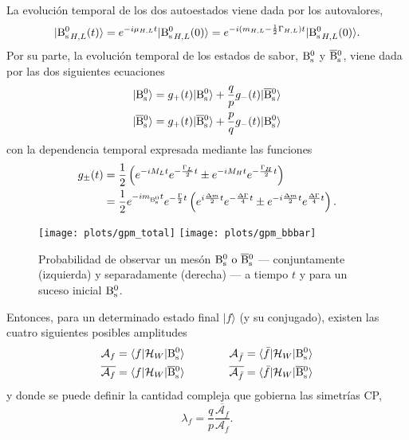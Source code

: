 La evolución temporal de los dos autoestados viene dada por los autovalores,
\[|{\mathrm{B}{}_{\mathrm{s}}^{0}}_{H,L} (t) \rangle  = e^{-i \mu_{H,L}t } |{\mathrm{B}{}_{\mathrm{s}}^{0}}_{H,L} (0)\rangle = e^{-i (m_{H,L} - \frac{1}{2} \Gamma_{H,L})t} |{\mathrm{B}{}_{\mathrm{s}}^{0}}_{H,L} (0)\rangle. \]
Por su parte, la evolución temporal de los estados de sabor, $\mathrm{B}{}_{\mathrm{s}}^{0}$ y $\overline{\mathrm{B}}{}_{\mathrm{s}}^{0}$, viene dada por las dos siguientes ecuaciones
\begin{equation}
\begin{split}
|\mathrm{B}{}_{\mathrm{s}}^{0}\rangle  = g_+(t) |\mathrm{B}{}_{\mathrm{s}}^{0}\rangle  + \frac{q}{p} g_-(t) |\overline{\mathrm{B}}{}_{\mathrm{s}}^{0}\rangle\\
|\overline{\mathrm{B}}{}_{\mathrm{s}}^{0}\rangle = g_+(t) |\overline{\mathrm{B}}{}_{\mathrm{s}}^{0}\rangle + \frac{p}{q} g_-(t) |\mathrm{B}{}_{\mathrm{s}}^{0} \rangle
\end{split}	
\end{equation}
%
con la dependencia temporal expresada mediante las funciones
\begin{equation}
\begin{split}
g_{\pm}(t) &=  \frac{1}{2} \left( e^{-iM_Lt} e^{-\frac{\Gamma_L}{2} t} \pm e^{-iM_Ht} e^{-\frac{\Gamma_H}{2} t} \right) \\
& = \frac{1}{2} e^{-im_{\mathrm{B}{}_{\mathrm{s}}^{0}}t} e^{-\frac{\Gamma}{2}t} \left( e^{i\frac{\Delta m}{2}t} e^{-\frac{\Delta \Gamma}{4}t}  \pm e^{-i\frac{\Delta m}{2}t} e^{\frac{\Delta \Gamma}{4}t} \right).	
\end{split} \label{eq_gedete}
\end{equation}
%
%
%
%
%
\begin{figure}[H]
\centering
\texttt{[image: plots/gpm\_total]}	 \hfill
\texttt{[image: plots/gpm\_bbbar]}	 \hfill
\caption{Probabilidad de observar un mesón $\mathrm{B}{}_{\mathrm{s}}^{0} \text{ o } \overline{\mathrm{B}}{}_{\mathrm{s}}^{0}$ --- conjuntamente  (izquierda) y separadamente (derecha) --- a tiempo $t$ \color{vero} y para un suceso inicial $\mathrm{B}{}_{\mathrm{s}}^{0}$. \color{norm} }
\end{figure}

Entonces, para un determinado estado final $|f\rangle$ (y su conjugado), existen las cuatro siguientes posibles amplitudes
\begin{equation}
\begin{split}
\mathcal{A}_f = \langle f | \mathcal{H}_{W} | \mathrm{B}{}_{\mathrm{s}}^{0} \rangle \qquad \qquad\mathcal{A}_{\bar f} = \langle \bar f | \mathcal{H}_{W} | \mathrm{B}{}_{\mathrm{s}}^{0} \rangle \\
\overline{\mathcal{A}_f} = \langle f | \mathcal{H}_{W} | \overline{\mathrm{B}}{}_{\mathrm{s}}^{0} \rangle \qquad \qquad \overline{\mathcal{A}_{\bar f}} = \langle \bar f | \mathcal{H}_{W} | \overline{\mathrm{B}}{}_{\mathrm{s}}^{0} \rangle
\end{split}
\end{equation}
%
\color{vero} y donde se puede definir la cantidad compleja que gobierna las simetrías CP, 
%
\begin{equation}
\lambda_f = \frac{q}{p} \frac{\overline{\mathcal{A}_f}}{\mathcal{A}_f}.
\end{equation}
\color{norm}






